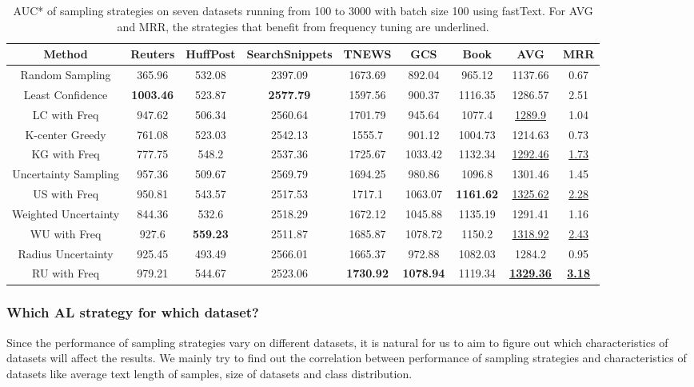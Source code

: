 \begin{table}[th]
	\centering
	\scriptsize
	\begin{tabular}{ccccccc|cc}
		\toprule
Method & Reuters & HuffPost & SearchSnippets & TNEWS & GCS & Book & AVG & MRR\\ \hline
Random Sampling & 365.96 & 532.08 & 2397.09  & 1673.69 & 892.04 & 965.12 & 1137.66 & 0.67\\ \hline
Least Confidence & \textbf{1003.46} & 523.87 & \textbf{2577.79} & 1597.56 & 900.37 & 1116.35 & 1286.57 & 2.51\\
LC with Freq & 947.62 & 506.34 & 2560.64  & 1701.79 & 945.64 & 1077.4 & \underline{1289.9} & 1.04\\ \hline
K-center Greedy & 761.08 &523.03 & 2542.13 & 1555.7 & 901.12 & 1004.73 & 1214.63 & 0.73\\
KG with Freq & 777.75 & 548.2 & 2537.36 & 1725.67 & 1033.42 & 1132.34 & \underline{1292.46} & \underline{1.73}\\ \hline        
Uncertainty Sampling & 957.36 &509.67 & 2569.79 & 1694.25 & 980.86 & 1096.8 & 1301.46 & 1.45\\
US with Freq & 950.81 & 543.57 & 2517.53 & 1717.1 & 1063.07 & \textbf{1161.62} & \underline{1325.62} & \underline{2.28}\\ \hline
Weighted Uncertainty & 844.36 & 532.6  & 2518.29  & 1672.12 & 1045.88 & 1135.19 & 1291.41 & 1.16\\
WU with Freq & 927.6 & \textbf{559.23} & 2511.87 & 1685.87 & 1078.72 & 1150.2 & \underline{1318.92} & \underline{2.43}\\ \hline
Radius Uncertainty & 925.45 & 493.49 & 2566.01 & 1665.37 & 972.88 & 1082.03 & 1284.2 & 0.95\\
RU with Freq & 979.21 & 544.67 & 2523.06 & \textbf{1730.92} & \textbf{1078.94} & 1119.34 & \textbf{\underline{1329.36}} &\textbf{ \underline{3.18}}\\ \hline
	\end{tabular}
\caption{AUC* of sampling strategies on seven datasets running from 100 to 3000 with batch size 100 using fastText. For AVG and MRR, 
the strategies that benefit from frequency tuning are underlined.}
\label{table:auc_ft}
\end{table}


\subsubsection{Which AL strategy for which dataset?}
Since the performance of sampling strategies vary on different datasets, it is natural for us to aim to figure out which characteristics of datasets will affect the results. We mainly try to find out the correlation between performance of sampling strategies and characteristics of datasets like average text length of samples, size of datasets and class distribution.

